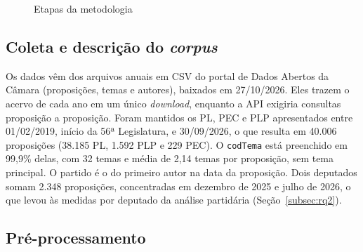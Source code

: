 \documentclass[12pt]{article}
\begin{document}
\begin{figure}[H]
\centering
{}
\caption{Etapas da metodologia}
\label{fig:fluxo}
\end{figure}

\subsection{Coleta e descrição do \textit{corpus}}
\label{subsec:corpus}

Os dados vêm dos arquivos anuais em CSV do portal de Dados Abertos da Câmara (proposições, temas e autores), baixados em 27/10/2026. Eles trazem o acervo de cada ano em um único \textit{download}, enquanto a API exigiria consultas proposição a proposição. Foram mantidos os PL, PEC e PLP apresentados entre 01/02/2019, início da 56ª Legislatura, e 30/09/2026, o que resulta em 40.006 proposições (38.185 PL, 1.592 PLP e 229 PEC). O \texttt{codTema} está preenchido em 99,9\% delas, com 32 temas e média de 2,14 temas por proposição, sem tema principal. O partido é o do primeiro autor na data da proposição. Dois deputados somam 2.348 proposições, concentradas em dezembro de 2025 e julho de 2026, o que levou às medidas por deputado da análise partidária (Seção~\ref{subsec:rq2}).

\subsection{Pré-processamento}
\label{subsec:texto}
\end{document}
